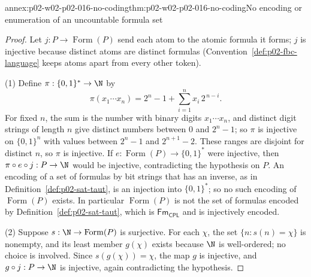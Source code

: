 \begin{annexitem}{annex:p02-w02-p02-016-no-coding}{thm:p02-w02-p02-016-no-coding}{No encoding or enumeration of an uncountable formula set}
\begin{proof}
Let \(j:P\to\operatorname{Form}(P)\) send each atom to the atomic formula it
forms; \(j\) is injective because distinct atoms are distinct formulas
(Convention~\ref{def:p02-fbc-language} keeps atoms apart from every other
token).

(1) Define \(\pi:\{0,1\}^*\to\N\) by
\[
 \pi(x_1\cdots x_n)=2^{n}-1+\sum_{i=1}^{n}x_i\,2^{\,n-i}.
\]
For fixed \(n\), the sum is the number with binary digits \(x_1\cdots x_n\),
and distinct digit strings of length \(n\) give distinct numbers between
\(0\) and \(2^n-1\); so \(\pi\) is injective on \(\{0,1\}^n\) with values
between \(2^n-1\) and \(2^{n+1}-2\).  These ranges are disjoint for distinct
\(n\), so \(\pi\) is injective.  If \(e:\operatorname{Form}(P)\to\{0,1\}^*\)
were injective, then \(\pi\circ e\circ j:P\to\N\) would be injective,
contradicting the hypothesis on \(P\).  An encoding of a set of formulas by
bit strings that has an inverse, as in Definition~\ref{def:p02-sat-taut}, is an
injection into \(\{0,1\}^*\); so no such encoding of \(\operatorname{Form}(P)\)
exists.  In particular \(\operatorname{Form}(P)\) is not the set of formulas
encoded by Definition~\ref{def:p02-sat-taut}, which is
\(\mathsf{Fm}_{\mathsf{CPL}}\) and is injectively encoded.

(2) Suppose \(s:\N\to\operatorname{Form}(P)\) is surjective.  For each
\(\chi\), the set \(\{n:s(n)=\chi\}\) is nonempty, and its least member
\(g(\chi)\) exists because \(\N\) is well-ordered; no choice is involved.
Since \(s(g(\chi))=\chi\), the map \(g\) is injective, and \(g\circ j:P\to\N\)
is injective, again contradicting the hypothesis.
\end{proof}
\end{annexitem}
